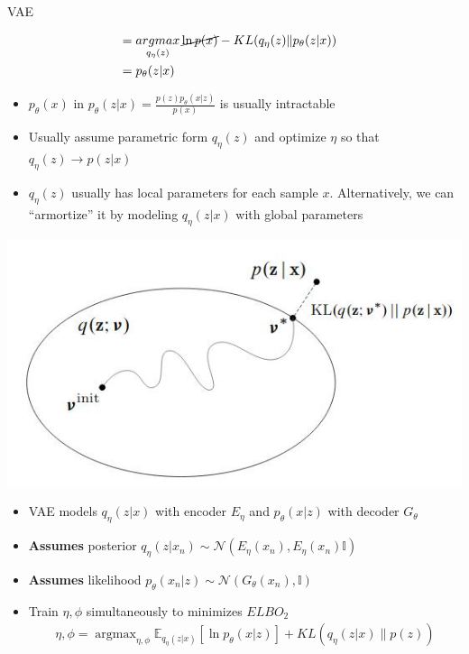 \documentclass[compress]{beamer}
\newcommand{\expects}[2]{\mathbb{E}_{#1} \left[ #2 \right]}
\begin{document}
\begin{frame}[allowframebreaks]{VAE}
\begin{itemize}
\begin{itemize}
\begin{align*}
                                    &  =  \mathop{argmax}_{q_\eta(z)} \cancel{\ln p(x)} - KL(q_{\eta}(z)\|p_{\theta}(z|x)) & \\ 
                                    & = p_{\theta}(z|x) & \\
                    \end{align*}
            \end{itemize}
    \end{itemize}
    \framebreak
    \begin{itemize}
        \item $p_{\theta}(x)$ in $p_{\theta}(z|x)= \frac{p(z)p_{\theta}(x|z)}{p(x)} $ is usually intractable
        \item Usually assume parametric form $q_{\eta}(z)$ and optimize $\eta$ so that $q_{\eta}(z)\rightarrow p(z|x)$
        \item $q_\eta(z)$ usually has local parameters for each sample $x$. Alternatively, we can ``armortize'' it by modeling $q_\eta(z|x)$ with global parameters
    \end{itemize}
    \includegraphics[scale=0.5]{vae}
    \framebreak

    \begin{itemize}
        \item VAE models $q_{\eta}(z|x)$ with encoder $E_{\eta}$ and $p_{\theta}(x|z)$  with decoder $G_{\theta}$ 
        \item \textbf{Assumes} posterior $q_{\eta}(z|x_n) \sim \mathcal{N}(E_{\eta}(x_n), E_{\eta}(x_n) \mathbb{I})$
        \item \textbf{Assumes} likelihood $p_{\theta}(x_n|z) \sim \mathcal{N}(G_{\theta}(x_n), \mathbb{I})$
        \item Train $\eta, \phi$ simultaneously to minimizes $ELBO_2$
            \begin{align*}
                \eta, \phi = \mathop{argmax}_{\eta, \phi} \expects{q_{\eta}(z|x)}{\ln p_{\theta}(x|z)} + KL(q_{\eta}(z|x)\|p(z))
            \end{align*}
                

\end{itemize}
\end{frame}
\end{document}
